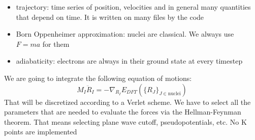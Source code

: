 \documentclass[landscape]{foils}
\begin{document}
\begin{itemize}
\item trajectory: time series of position, velocities and in general many quantities that depend on time. It is written on many files by the code
\item Born Oppenheimer approximation: nuclei are classical. We always use $F=ma$ for them
\item adiabaticity: electrons are always in their ground state at every timestep
\end{itemize}

We are going to integrate the following equation of motions:
\begin{equation}
	M_I\ddot R_I = -\nabla_{R_I} E_{DFT}(\{R_J\}_{J\in\text{nuclei}})
\end{equation}
That will be discretized according to a Verlet scheme. We have to select all the parameters that are needed to evaluate the forces via the Hellman-Feynman theorem.
That means selecting plane wave cutoff, pseudopotentials, etc. No K points are implemented
\end{document}
